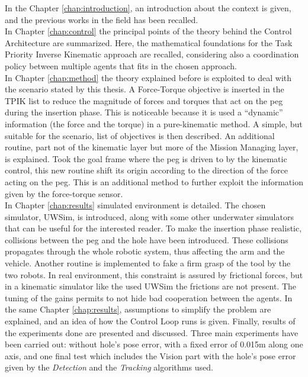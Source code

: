In the Chapter \ref{chap:introduction}, an introduction about the context is given, and the previous works in the field has been recalled.\\
In Chapter \ref{chap:control} the principal points of the theory behind the Control Architecture are summarized. Here, the mathematical foundations for the Task Priority Inverse Kinematic approach are recalled, considering also a coordination policy between multiple agents that fits in the chosen approach.\\
In Chapter \ref{chap:method} the theory explained before is exploited to deal with the scenario stated by this thesis. A Force-Torque objective is inserted in the TPIK list to reduce the magnitude of forces and torques that act on the peg during the insertion phase. This is noticeable because it is used a \enquote{dynamic} information (the force and the torque) in a pure-kinematic method. A simple, but suitable for the scenario, list of objectives is then described. An additional routine, part not of the kinematic layer but more of the Mission Managing layer, is explained. Took the goal frame where the peg is driven to by the kinematic control, this new routine shift its origin according to the direction of the force acting on the peg. This is an additional method to further exploit the information given by the force-torque sensor.\\
In Chapter \ref{chap:results} simulated environment is detailed. The chosen simulator, UWSim, is introduced, along with some other underwater simulators that can be useful for the interested reader. To make the insertion phase realistic, collisions between the peg and the hole have been introduced. These collisions propagates through the whole robotic system, thus affecting the arm and the vehicle. Another routine is implemented to fake a firm grasp of the tool by the two robots. In real environment, this constraint is assured by frictional forces, but in a kinematic simulator like the used UWSim the frictions are not present. The tuning of the gains permits to not hide bad cooperation between the agents.  In the same Chapter \ref{chap:results}, assumptions to simplify the problem are explained, and an idea of how the Control Loop runs is given. Finally, results of the experiments done are presented and discussed. Three main experiments have been carried out: without hole's pose error, with a fixed error of 0.015m along one axis, and one final test which includes the Vision part with the hole's pose error given by the \textit{Detection} and the \textit{Tracking} algorithms used.\\
